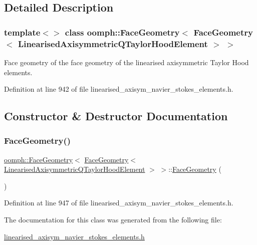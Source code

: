 \subsection{Detailed Description}
\subsubsection*{template$<$$>$\newline
class oomph\+::\+Face\+Geometry$<$ Face\+Geometry$<$ Linearised\+Axisymmetric\+Q\+Taylor\+Hood\+Element $>$ $>$}

Face geometry of the face geometry of the linearised axisymmetric Taylor Hood elements. 

Definition at line 942 of file linearised\+\_\+axisym\+\_\+navier\+\_\+stokes\+\_\+elements.\+h.



\subsection{Constructor \& Destructor Documentation}
\mbox{\label{classoomph_1_1FaceGeometry_3_01FaceGeometry_3_01LinearisedAxisymmetricQTaylorHoodElement_01_4_01_4_a32effe2e7186dc9f004ad29add157dd0}} 
\subsubsection{\texorpdfstring{Face\+Geometry()}{FaceGeometry()}}
{\footnotesize\ttfamily \hyperlink{classoomph_1_1FaceGeometry}{oomph\+::\+Face\+Geometry}$<$ \hyperlink{classoomph_1_1FaceGeometry}{Face\+Geometry}$<$ \hyperlink{classoomph_1_1LinearisedAxisymmetricQTaylorHoodElement}{Linearised\+Axisymmetric\+Q\+Taylor\+Hood\+Element} $>$ $>$\+::\hyperlink{classoomph_1_1FaceGeometry}{Face\+Geometry} (\begin{DoxyParamCaption}{ }\end{DoxyParamCaption})\hspace{0.3cm}{\ttfamily [inline]}}



Definition at line 947 of file linearised\+\_\+axisym\+\_\+navier\+\_\+stokes\+\_\+elements.\+h.



The documentation for this class was generated from the following file\+:\begin{DoxyCompactItemize}
\item 
\hyperlink{linearised__axisym__navier__stokes__elements_8h}{linearised\+\_\+axisym\+\_\+navier\+\_\+stokes\+\_\+elements.\+h}\end{DoxyCompactItemize}
